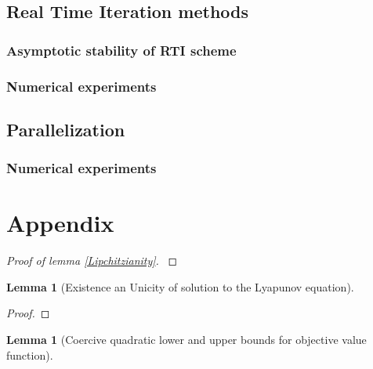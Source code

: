 \documentclass[12pt]{article}
\newtheorem{lemma}[theorem]{Lemma}
\theoremstyle{definition}
\theoremstyle{remark}
\begin{document}
\subsection{Real Time Iteration methods}
\subsubsection{Asymptotic stability of RTI scheme}
\subsubsection{Numerical experiments}

\subsection{Parallelization}
\subsubsection{Numerical experiments}

\section{Appendix}
\printbibliography
\begin{proof}[Proof of lemma \ref{Lipchitzianity}]
\cite{RRLB-linear-MPC}
\end{proof}

\begin{lemma}[Existence an Unicity of solution to the Lyapunov equation]
	
\end{lemma}

\begin{proof}
	
\end{proof}

\begin{lemma}[Coercive quadratic lower and upper bounds for objective value function]

\end{lemma}
\end{document}
